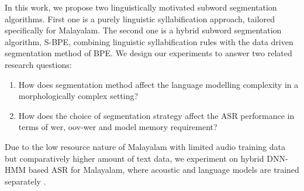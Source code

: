 In this work, we propose two linguistically motivated subword segmentation algorithms.  First one is a purely linguistic syllabification approach, tailored specifically for Malayalam. The second one is a hybrid subword segmentation algorithm, S-BPE,
combining linguistic syllabification rules with the data driven segmentation
method of BPE. We design our experiments to answer two related research
questions:

\begin{enumerate}
    \item How does segmentation method affect the language modelling complexity in a
          morphologically complex setting?
    \item How does the choice of segmentation strategy affect the ASR performance in
          terms of \gls{wer}, \gls{oov}-\gls{wer} and model memory requirement?

\end{enumerate}

Due to the low resource nature of Malayalam with limited audio training data
but comparatively higher amount of text data, we experiment on hybrid DNN-HMM
based ASR for Malayalam, where acoustic and language models are trained
separately \cite{bayerl2019comparison,aku2021specom}.



